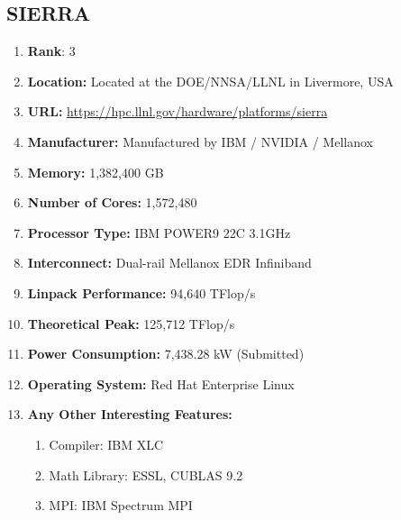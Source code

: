 \documentclass[12pt, a4paper, fleqn, titlepage]{article}
\begin{document}
    \subsection{SIERRA}
        \begin{flushleft}
            \begin{enumerate}[\textbullet]
                \item \textbf{Rank}: 3
                \item \textbf{Location:} 
                    Located at the DOE/NNSA/LLNL in Livermore, USA
                \item \textbf{URL:} 
                    \url{https://hpc.llnl.gov/hardware/platforms/sierra}
                \item \textbf{Manufacturer:} Manufactured by IBM / NVIDIA / Mellanox
                \item \textbf{Memory:} 1,382,400 GB
                \item \textbf{Number of Cores:} 1,572,480
                \item \textbf{Processor Type:} IBM POWER9 22C 3.1GHz
                \item \textbf{Interconnect:} Dual-rail Mellanox EDR Infiniband
                \item \textbf{Linpack Performance:} 94,640 TFlop/s
                \item \textbf{Theoretical Peak:} 125,712 TFlop/s
                \item \textbf{Power Consumption:} 7,438.28 kW (Submitted)
                \item \textbf{Operating System:} Red Hat Enterprise Linux
                \item \textbf{Any Other Interesting Features:}
                    \begin{enumerate}
                        \item Compiler: IBM XLC
                        \item Math Library: ESSL, CUBLAS 9.2
                        \item MPI: IBM Spectrum MPI
                    \end{enumerate}
            \end{enumerate}
        \end{flushleft}
\end{document}
